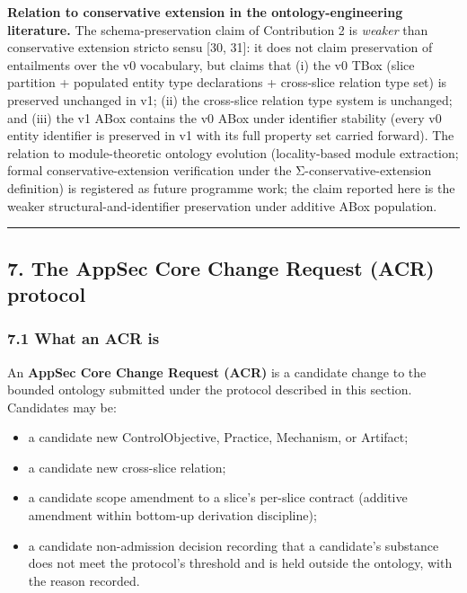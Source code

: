 \documentclass[
]{article}
\providecommand{\tightlist}{%
  \setlength{\itemsep}{0pt}\setlength{\parskip}{0pt}}
\begin{document}
\textbf{Relation to conservative extension in the ontology-engineering
literature.} The schema-preservation claim of Contribution 2 is
\emph{weaker} than conservative extension stricto sensu {[}30, 31{]}: it
does not claim preservation of entailments over the v0 vocabulary, but
claims that (i) the v0 TBox (slice partition + populated entity type
declarations + cross-slice relation type set) is preserved unchanged in
v1; (ii) the cross-slice relation type system is unchanged; and (iii)
the v1 ABox contains the v0 ABox under identifier stability (every v0
entity identifier is preserved in v1 with its full property set carried
forward). The relation to module-theoretic ontology evolution
(locality-based module extraction; formal conservative-extension
verification under the Σ-conservative-extension definition) is
registered as future programme work; the claim reported here is the
weaker structural-and-identifier preservation under additive ABox
population.

\begin{center}\rule{0.5\linewidth}{0.5pt}\end{center}

\subsection{7. The AppSec Core Change Request (ACR)
protocol}\label{the-appsec-core-change-request-acr-protocol}

\subsubsection{7.1 What an ACR is}\label{what-an-acr-is}

An \textbf{AppSec Core Change Request (ACR)} is a candidate change to
the bounded ontology submitted under the protocol described in this
section. Candidates may be:

\begin{itemize}
\tightlist
\item
  a candidate new ControlObjective, Practice, Mechanism, or Artifact;
\item
  a candidate new cross-slice relation;
\item
  a candidate scope amendment to a slice's per-slice contract (additive
  amendment within bottom-up derivation discipline);
\item
  a candidate non-admission decision recording that a candidate's
  substance does not meet the protocol's threshold and is held outside
  the ontology, with the reason recorded.
\end{itemize}
\end{document}
